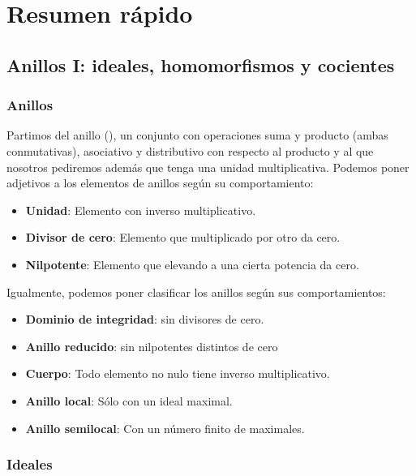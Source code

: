 
\chapter{Resumen rápido}

\section{Anillos I: ideales, homomorfismos y cocientes}

\subsection{Anillos}

Partimos del anillo (), un conjunto con operaciones suma y producto (ambas conmutativas), asociativo y distributivo con respecto al producto y al que nosotros pediremos además que tenga una unidad multiplicativa. Podemos poner adjetivos a los elementos de anillos según su comportamiento:

\begin{itemize}[itemsep = -2pt]
\item \textbf{Unidad}: Elemento con inverso multiplicativo.
\item \textbf{Divisor de cero}: Elemento que multiplicado por otro da cero.
\item \textbf{Nilpotente}: Elemento que elevando a una cierta potencia da cero.
\end{itemize}

Igualmente, podemos poner clasificar los anillos según sus comportamientos:

\begin{itemize}[itemsep = -2pt]
\item \textbf{Dominio de integridad}: sin divisores de cero.
\item \textbf{Anillo reducido}: sin nilpotentes distintos de cero
\item \textbf{Cuerpo}: Todo elemento no nulo tiene inverso multiplicativo.
\item \textbf{Anillo local}: Sólo con un ideal maximal.
\item \textbf{Anillo semilocal}: Con un número finito de maximales.
\end{itemize}

\subsection{Ideales}

